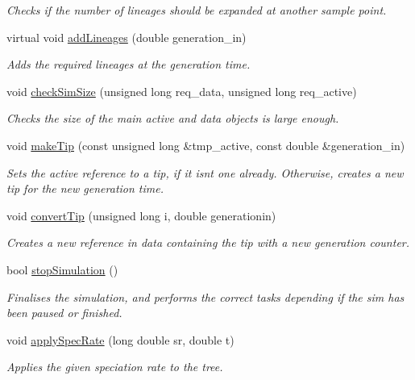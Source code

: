 \begin{DoxyCompactItemize}
\begin{DoxyCompactList}\small\item\em Checks if the number of lineages should be expanded at another sample point. \end{DoxyCompactList}\item 
virtual void \hyperlink{class_tree_a8bfa9a86f122b21900ec33ab4b1e323f}{add\+Lineages} (double generation\+\_\+in)
\begin{DoxyCompactList}\small\item\em Adds the required lineages at the generation time. \end{DoxyCompactList}\item 
void \hyperlink{class_tree_ab8a62d0ca2b1746676073e3f33e2a949}{check\+Sim\+Size} (unsigned long req\+\_\+data, unsigned long req\+\_\+active)
\begin{DoxyCompactList}\small\item\em Checks the size of the main active and data objects is large enough. \end{DoxyCompactList}\item 
void \hyperlink{class_tree_a0973cc37d9b95144db76d36cb363caca}{make\+Tip} (const unsigned long \&tmp\+\_\+active, const double \&generation\+\_\+in)
\begin{DoxyCompactList}\small\item\em Sets the active reference to a tip, if it isn\textquotesingle{}t one already. Otherwise, creates a new tip for the new generation time. \end{DoxyCompactList}\item 
void \hyperlink{class_tree_a6af2aaa691ffbb9899e3f070a715e371}{convert\+Tip} (unsigned long i, double generationin)
\begin{DoxyCompactList}\small\item\em Creates a new reference in data containing the tip with a new generation counter. \end{DoxyCompactList}\item 
bool \hyperlink{class_tree_afd6bd75c301d2f57c4997fcfc92f192e}{stop\+Simulation} ()
\begin{DoxyCompactList}\small\item\em Finalises the simulation, and performs the correct tasks depending if the sim has been paused or finished. \end{DoxyCompactList}\item 
void \hyperlink{class_tree_aa6349a32b3fcfb82a5f8311b11db3982}{apply\+Spec\+Rate} (long double sr, double t)
\begin{DoxyCompactList}\small\item\em Applies the given speciation rate to the tree. \end{DoxyCompactList}\item 

\end{DoxyCompactItemize}
